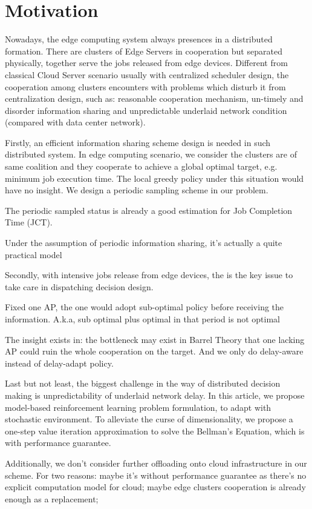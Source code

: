 \section{Motivation}
Nowadays, the edge computing system always presences in a distributed formation.
There are clusters of Edge Servers in cooperation but separated physically, together serve the jobs released from edge devices.
Different from classical Cloud Server scenario usually with centralized scheduler design, the cooperation among clusters encounters with problems which disturb it from centralization design, such as: reasonable cooperation mechanism, un-timely and disorder information sharing and unpredictable underlaid network condition (compared with data center network).

Firstly, an efficient information sharing scheme design is needed in such distributed system.
In edge computing scenario, we consider the clusters are of same coalition and they cooperate to achieve a global optimal target, e.g. minimum job execution time.
The local greedy policy under this situation would have no insight.
We design a periodic sampling scheme in our problem.
\begin{example}
    The periodic sampled status is already a good estimation for Job Completion Time (JCT).
\end{example}
Under the assumption of periodic information sharing, it's actually a quite practical model 

Secondly, with intensive jobs release from edge devices, the \brdelay is the key issue to take care in dispatching decision design.
\begin{example}
    Fixed one AP, the one would adopt sub-optimal policy before receiving the information. A.k.a, sub optimal plus optimal in that period is not optimal
\end{example}
The insight exists in: the bottleneck may exist in Barrel Theory that one lacking AP could ruin the whole cooperation on the target.
And we only do delay-aware instead of delay-adapt policy.

Last but not least, the biggest challenge in the way of distributed decision making is unpredictability of underlaid network delay.
In this article, we propose model-based reinforcement learning problem formulation, to adapt with stochastic environment.
To alleviate the curse of dimensionality, we propose a one-step value iteration approximation to solve the Bellman's Equation, which is with performance guarantee.

Additionally, we don't consider further offloading onto cloud infrastructure in our scheme.
For two reasons: maybe it's without performance guarantee as there's no explicit computation model for cloud; maybe edge clusters cooperation is already enough as a replacement; 
